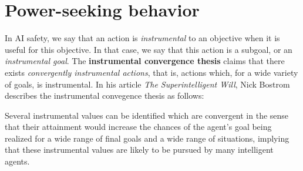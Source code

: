 \documentclass{article}
\newtheorem{theorem}{Theorem}[section]
\theoremstyle{definition}
\theoremstyle{remark}
\newtheorem*{remark}{Remark}
\theoremstyle{example}
\DeclareMathOperator*{\argmax}{arg\,max} %
\begin{document}





\section{Power-seeking behavior}

In AI safety, we say that an action is \textit{instrumental} to an objective when it is useful for this objective. In that case, we say that this action is a subgoal, or an \textit{instrumental goal}. The \textbf{instrumental convergence thesis} claims that there exists \textit{convergently instrumental actions}, that is, actions which, for a wide variety of goals, is instrumental. In his article \textit{The Superintelligent Will}, Nick Bostrom describes the instrumental convegence thesis as follows:

\begin{displayquote}
		Several instrumental values can be identified which are convergent in the sense that their attainment would increase the chances of the agent’s goal being realized for a wide range of final goals and a wide range of situations, implying that these instrumental values are likely to be pursued by many intelligent agents.
\end{displayquote}
\end{document}
